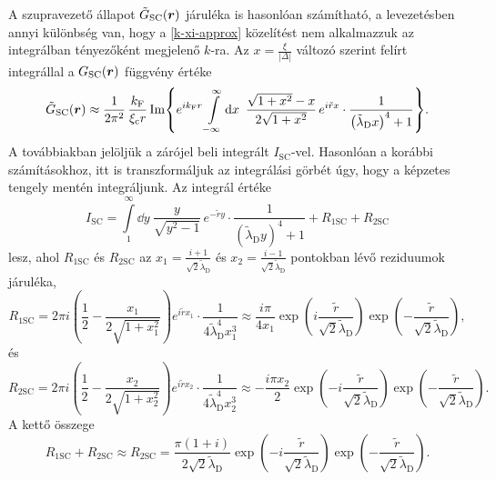 \documentclass[a4paper,12pt,titlepage]{article}
\newcommand{\RR}{{\vb*{r}}}
\newcommand{\kF}{{k_\text{F}}}
\newcommand{\xic}{{\xi_\text{c}}}
\begin{document}
A szupravezető állapot $\tilde{G}_\text{SC}(\RR)$ járuléka is hasonlóan számítható, a levezetésben annyi különbség van, hogy a \eqref{k-xi-approx} közelítést nem alkalmazzuk az integrálban tényezőként megjelenő $k$-ra.  Az $x = \frac{\xi}{\left| \Delta \right|}$ változó szerint felírt integrállal a $G_\text{SC}(\RR)$ függvény értéke
\begin{equation}
	\tilde{G}_\text{SC}(\RR) \approx \frac{1}{2 \pi^2} \, \frac{\kF}{\xic r} \Im{ e^{i \kF r} \int\limits_{-\infty}^\infty \dd{x} ~ \frac{\sqrt{1 + x^2} - x}{2 \sqrt{1 + x^2}} \, e^{i \tilde{r} x} \cdot \frac{1}{\left( \tilde{\lambda}_\text{D} x \right)^4 + 1} }.
\end{equation}
A továbbiakban jelöljük a zárójel beli integrált $I_\text{SC}$-vel.  Hasonlóan a korábbi számításokhoz, itt is transzformáljuk az integrálási görbét úgy, hogy a képzetes tengely mentén integráljunk.  Az integrál értéke
\begin{equation}
	I_\text{SC} = \int\limits_1^\infty \dd{y} ~ \frac{y}{\sqrt{y^2 - 1}} \, e^{-\tilde{r} y} \cdot \frac{1}{\left( \tilde{\lambda}_\text{D} y \right)^4 + 1} + R_{1 \text{SC}} + R_{2 \text{SC}}
\end{equation}
lesz, ahol $R_{1 \text{SC}}$ és $R_{2 \text{SC}}$ az $x_1 = \frac{i + 1}{\sqrt{2} \tilde{\lambda}_\text{D}}$ és $x_2 = \frac{i - 1}{\sqrt{2} \tilde{\lambda}_\text{D}}$ pontokban lévő reziduumok járuléka,
\begin{equation}
	R_{1 \text{SC}} = 2 \pi i \left( \frac{1}{2} - \frac{x_1}{2 \sqrt{1 + x_1^2}} \right) e^{i \tilde{r} x_1} \cdot \frac{1}{4 \tilde{\lambda}_\text{D}^4 x_1^3} \approx \frac{i \pi}{4 x_1} \exp(i \frac{\tilde{r}}{\sqrt{2} \tilde{\lambda}_\text{D}}) \exp(-\frac{\tilde{r}}{\sqrt{2} \tilde{\lambda}_\text{D}}),
\end{equation}
és
\begin{equation}
	R_{2 \text{SC}} = 2 \pi i \left( \frac{1}{2} - \frac{x_2}{2 \sqrt{1 + x_2^2}} \right) e^{i \tilde{r} x_2} \cdot \frac{1}{4 \tilde{\lambda}_\text{D}^4 x_2^3} \approx -\frac{i \pi x_2}{2} \exp(-i \frac{\tilde{r}}{\sqrt{2} \tilde{\lambda}_\text{D}}) \exp(-\frac{\tilde{r}}{\sqrt{2} \tilde{\lambda}_\text{D}}).
\end{equation}
A kettő összege
\begin{equation}
	R_{1 \text{SC}} + R_{2 \text{SC}} \approx R_{2 \text{SC}} = \frac{\pi \left( 1 + i \right)}{2 \sqrt{2} \tilde{\lambda}_\text{D}} \exp(-i \frac{\tilde{r}}{\sqrt{2} \tilde{\lambda}_\text{D}}) \exp(-\frac{\tilde{r}}{\sqrt{2} \tilde{\lambda}_\text{D}}).
\end{equation}
\end{document}
